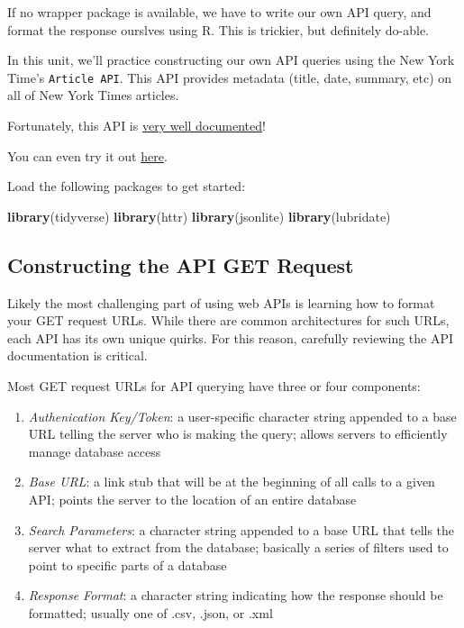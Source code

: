 \documentclass[]{book}
\newenvironment{Shaded}{\begin{snugshade}}{\end{snugshade}}
\newcommand{\KeywordTok}[1]{\textcolor[rgb]{0.13,0.29,0.53}{\textbf{#1}}}
\newcommand{\NormalTok}[1]{#1}
\begin{document}
If no wrapper package is available, we have to write our own API query,
and format the response ourslves using R. This is trickier, but
definitely do-able.

In this unit, we'll practice constructing our own API queries using the
New York Time's \texttt{Article\ API}. This API provides metadata
(title, date, summary, etc) on all of New York Times articles.

Fortunately, this API is
\href{https://developer.nytimes.com/docs/articlesearch-product/1/overview}{very
well documented}!

You can even try it out
\href{http://developer.nytimes.com/io-docs}{here}.

Load the following packages to get started:

\begin{Shaded}
\begin{Highlighting}[]
\KeywordTok{library}\NormalTok{(tidyverse)}
\KeywordTok{library}\NormalTok{(httr)}
\KeywordTok{library}\NormalTok{(jsonlite)}
\KeywordTok{library}\NormalTok{(lubridate)}
\end{Highlighting}
\end{Shaded}

\subsection{Constructing the API GET
Request}\label{constructing-the-api-get-request}

Likely the most challenging part of using web APIs is learning how to
format your GET request URLs. While there are common architectures for
such URLs, each API has its own unique quirks. For this reason,
carefully reviewing the API documentation is critical.

Most GET request URLs for API querying have three or four components:

\begin{enumerate}
\def\labelenumi{\arabic{enumi}.}
\item
  \emph{Authenication Key/Token}: a user-specific character string
  appended to a base URL telling the server who is making the query;
  allows servers to efficiently manage database access
\item
  \emph{Base URL}: a link stub that will be at the beginning of all
  calls to a given API; points the server to the location of an entire
  database
\item
  \emph{Search Parameters}: a character string appended to a base URL
  that tells the server what to extract from the database; basically a
  series of filters used to point to specific parts of a database
\item
  \emph{Response Format}: a character string indicating how the response
  should be formatted; usually one of .csv, .json, or .xml
\end{enumerate}
\end{document}
